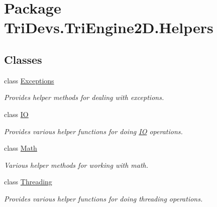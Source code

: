 \hypertarget{namespace_tri_devs_1_1_tri_engine2_d_1_1_helpers}{\section{Package Tri\-Devs.\-Tri\-Engine2\-D.\-Helpers}
\label{namespace_tri_devs_1_1_tri_engine2_d_1_1_helpers}
}
\subsection*{Classes}
\begin{DoxyCompactItemize}
\item 
class \hyperlink{class_tri_devs_1_1_tri_engine2_d_1_1_helpers_1_1_exceptions}{Exceptions}
\begin{DoxyCompactList}\small\item\em Provides helper methods for dealing with exceptions. \end{DoxyCompactList}\item 
class \hyperlink{class_tri_devs_1_1_tri_engine2_d_1_1_helpers_1_1_i_o}{I\-O}
\begin{DoxyCompactList}\small\item\em Provides various helper functions for doing \hyperlink{class_tri_devs_1_1_tri_engine2_d_1_1_helpers_1_1_i_o}{I\-O} operations. \end{DoxyCompactList}\item 
class \hyperlink{class_tri_devs_1_1_tri_engine2_d_1_1_helpers_1_1_math}{Math}
\begin{DoxyCompactList}\small\item\em Various helper methods for working with math. \end{DoxyCompactList}\item 
class \hyperlink{class_tri_devs_1_1_tri_engine2_d_1_1_helpers_1_1_threading}{Threading}
\begin{DoxyCompactList}\small\item\em Provides various helper functions for doing threading operations. \end{DoxyCompactList}\end{DoxyCompactItemize}
